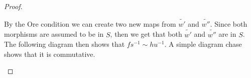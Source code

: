 \documentclass[12pt]{article}
\theoremstyle{definition}
\theoremstyle{remark}
\begin{document}
\begin{proof}
\begin{itemize}
\begin{center}
                    \end{center}
                    By the Ore condition we can create two new maps from $\widetilde{w'}$ and $\widetilde{w''}$. Since both morphisms are assumed to be in $S$, then we get that both $\widetilde{w'}$ and $\widetilde{w''}$ are in $S$. The following diagram then shows that $fs^{-1}\sim hu^{-1}$. A simple diagram chase shows that it is commutative.
                    \begin{center}
                    \end{center}
                \end{itemize}
            \end{proof}
\end{document}
